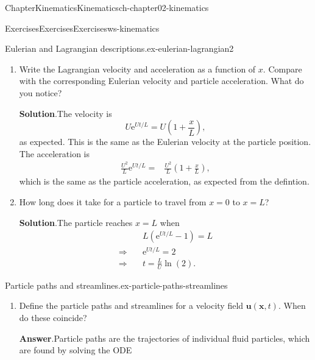 \documentclass[oneside,10pt,]{book}
\newcommand{\blocktitlefont}{\relax}
\numberwithin{equation}{section}
\newcommand{\e}{\mathrm{e}}
\newcommand{\de}{\mathrm{d}}
\newcommand{\dd}[2]{\frac{\de#1}{\de#2}}
\newcommand{\bx}{\boldsymbol{x}}
\newcommand{\bu}{\boldsymbol{u}}
\begin{document}
\begin{chapterptx}{Chapter}{Kinematics}{}{Kinematics}{}{}{ch-chapter02-kinematics}
\begin{exercises-section}{Exercises}{Exercises}{}{Exercises}{}{}{ws-kinematics}
\begin{divisionexercise}{4}{Eulerian and Lagrangian descriptions.}{}{ex-eulerian-lagrangian2}
\begin{enumerate}[font=\bfseries,label=(\alph*),ref=\alph*]
\par\smallskip%
\noindent\textbf{\blocktitlefont Solution}.\hypertarget{ex-eulerian-lagrangian2-6-2}{}\quad{}The acceleration is%
\begin{align*}
\dd{^2x}{t^2}=&\dd{}{t}\left(U\e^{Ut/L}\right)\\
=& \frac{U^2}{L}\e^{Ut/L}.
\end{align*}
%
\item{}Write the Lagrangian velocity and acceleration as a function of \(x\). Compare with the corresponding Eulerian velocity and particle acceleration. What do you notice?%
\par\smallskip%
\noindent\textbf{\blocktitlefont Solution}.\hypertarget{ex-eulerian-lagrangian2-7-2}{}\quad{}The velocity is%
\begin{equation*}
U\e^{Ut/L}=U\left(1+\frac{x}{L}\right),
\end{equation*}
as expected. This is the same as the Eulerian velocity at the particle position. The acceleration is%
\begin{align*}
\frac{U^2}{L}\e^{Ut/L}=&\frac{U^2}{L}\left(1+\frac{x}{L}\right),
\end{align*}
which is the same as the particle acceleration, as expected from the defintion.%
\item{}How long does it take for a particle to travel from \(x=0\) to \(x=L\)?%
\par\smallskip%
\noindent\textbf{\blocktitlefont Solution}.\hypertarget{ex-eulerian-lagrangian2-8-2}{}\quad{}The particle reaches \(x=L\) when%
\begin{align*}
& L\left(\e^{Ut/L}-1\right)=L\\
\Rightarrow\quad& \e^{Ut/L}=2\\
\Rightarrow\quad& t=\frac{L}{U}\ln(2).
\end{align*}
%
\end{enumerate}%
\end{divisionexercise}%
\begin{divisionexercise}{5}{Particle paths and streamlines.}{}{ex-particle-paths-streamlines}%
\begin{enumerate}[font=\bfseries,label=(\alph*),ref=\alph*]%
\item{}Define the particle paths and streamlines for a velocity field \(\bu(\bx,t)\). When do these coincide?%
\par\smallskip%
\noindent\textbf{\blocktitlefont Answer}.\hypertarget{ex-particle-paths-streamlines-2-2}{}\quad{}Particle paths are the trajectories of individual fluid particles, which are found by solving the ODE%

\end{enumerate}
\end{divisionexercise}
\end{exercises-section}
\end{chapterptx}
\end{document}
